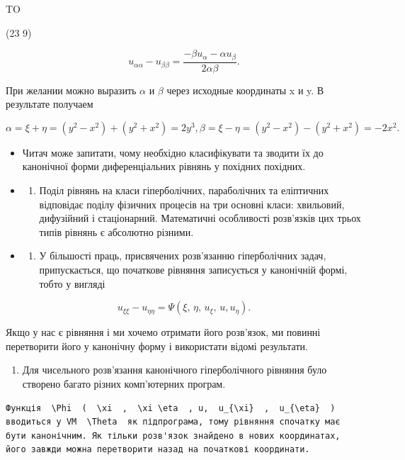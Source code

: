 \documentclass[
  ukrainian,
]{article}
\providecommand{\tightlist}{%
  \setlength{\itemsep}{0pt}\setlength{\parskip}{0pt}}
\begin{document}
TO

(23 9)

\[
u_{\alpha\alpha} - u_{\beta\beta} = \frac{-\beta u_{\alpha} - \alpha u_{\beta}}{2\alpha\beta}.
\]

При желании можно выразить \(\alpha\) и \(\beta\) через исходные
координаты x и y. В результате получаем

\[
\alpha = \xi + \eta = (y^2 - x^2) + (y^2 + x^2) = 2y^3,
\beta = \xi - \eta = (y^2 - x^2) - (y^2 + x^2) = -2x^2.
\]

\begin{itemize}
\item
  Читач може запитати, чому необхідно класифікувати та зводити їх до
  канонічної форми диференціальних рівнянь у похідних похідних.
\item
  \begin{enumerate}
  \def\labelenumi{\alph{enumi})}
  \tightlist
  \item
    Поділ рівнянь на класи гіперболічних, параболічних та еліптичних
    відповідає поділу фізичних процесів на три основні класи: хвильовий,
    дифузійний і стаціонарний. Математичні особливості розв'язків цих
    трьох типів рівнянь є абсолютно різними.
  \end{enumerate}
\item
  \begin{enumerate}
  \def\labelenumi{\alph{enumi})}
  \setcounter{enumi}{1}
  \tightlist
  \item
    У більшості праць, присвячених розв'язанню гіперболічних задач,
    припускається, що початкове рівняння записується у канонічній формі,
    тобто у вигляді
  \end{enumerate}
\end{itemize}

\[
u_{\xi\xi} - u_{\eta\eta} = \Psi(\xi, \, \eta, \, u_{\xi}, \, u, u_{\eta}).
\]

Якщо у нас є рівняння і ми хочемо отримати його розв'язок, ми повинні
перетворити його у канонічну форму і використати відомі результати.

\begin{enumerate}
\def\labelenumi{\alph{enumi})}
\setcounter{enumi}{2}
\tightlist
\item
  Для чисельного розв'язання канонічного гіперболічного рівняння було
  створено багато різних комп'ютерних програм.
\end{enumerate}

\begin{verbatim}
Функція  \Phi  (  \xi  ,  \xi \eta  , u,  u_{\xi}  ,  u_{\eta}  ) вводиться у VM  \Theta  як підпрограма, тому рівняння спочатку має бути канонічним. Як тільки розв'язок знайдено в нових координатах, його завжди можна перетворити назад на початкові координати.
\end{verbatim}
\end{document}
